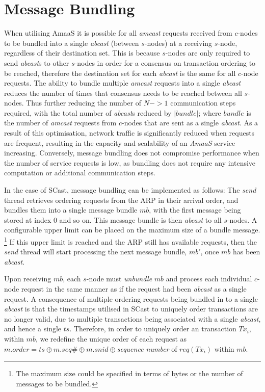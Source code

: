 \section{Message Bundling}\label{ssec:abaas_optimisations}
		When utilising \textsf{AmaaS} it is possible for all \emph{amcast} requests received from $c$-nodes to be bundled into a single \emph{abcast} (between $s$-nodes) at a receiving $s$-node, regardless of their destination set.  This is because $s$-nodes are only required to send \emph{abcast}s to other $s$-nodes in order for a consensus on transaction ordering to be reached, therefore the destination set for each \emph{abcast} is the same for all $c$-node requests.   The ability to bundle multiple \emph{amcast} requests into a single \emph{abcast} reduces the number of times that consensus needs to be reached between all $s$-nodes.  Thus further reducing the number of $N->1$ communication steps required, with the total number of \emph{abcast}s reduced by $\left\vert bundle \right\vert$; where $bundle$ is the number of  \emph{amcast} requests from $c$-nodes that are sent as a single \emph{abcast}.  As a result of this optimisation, network traffic is significantly reduced when requests are frequent, resulting in the capacity and scalability of an \emph{AmaaS} service increasing. Conversely, message bundling does not compromise performance when the number of service requests is low, as bundling does not require any intensive computation or additional communication steps.  
    
    In the case of \textsf{SCast}, message bundling can be implemented as follows: The \emph{send} thread retrieves ordering requests from the ARP in their arrival order, and bundles them into a single message bundle $mb$, with the first message being stored at index 0 and so on.  This message bundle is then \emph{abcast} to all $s$-nodes.  A configurable upper limit can be placed on the maximum size of a bundle message. \footnote{The maximum size could be specified in terms of bytes or the number of messages to be bundled.} If this upper limit is reached and the ARP still has available requests, then the \emph{send} thread will start processing the next message bundle, $mb'$, once $mb$ has been \emph{abcast}.  
    
    Upon receiving $mb$, each $s$-node must \emph{unbundle} $mb$ and process each individual $c$-node request in the same manner as if the request had been \emph{abcast} as a single request.  A consequence of multiple ordering requests being bundled in to a single \emph{abcast} is that the timestamps utilised in \textsf{SCast} to uniquely order transactions are no longer valid, due to multiple transactions being associated with a single \emph{abcast}, and hence a single $ts$.  Therefore, in order to uniquely order an transaction $Tx_i$, within $mb$, we redefine the unique order of each request as $m.order = ts\oplus m.seq\# \oplus m.snid \oplus$\emph{sequence number} of $req(Tx_i)$ within $mb$.  

